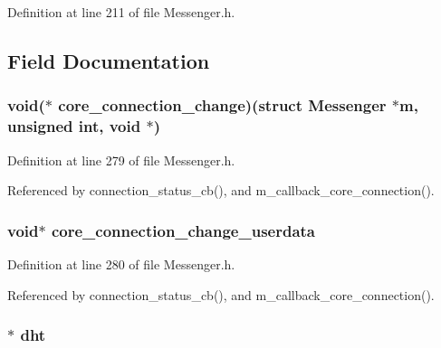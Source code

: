 Definition at line 211 of file Messenger.\+h.



\subsection{Field Documentation}
\hypertarget{struct_messenger_a04d6d710a221e33282b2305ec4158ac4}{
\subsubsection[{core\+\_\+connection\+\_\+change}]{\setlength{\rightskip}{0pt plus 5cm}void($\ast$ core\+\_\+connection\+\_\+change)(struct {\bf Messenger} $\ast${\bf m}, unsigned int, void $\ast$)}}\label{struct_messenger_a04d6d710a221e33282b2305ec4158ac4}


Definition at line 279 of file Messenger.\+h.



Referenced by connection\+\_\+status\+\_\+cb(), and m\+\_\+callback\+\_\+core\+\_\+connection().

\hypertarget{struct_messenger_a55d1d5f05bdf28588035d0bffd52ac3a}{
\subsubsection[{core\+\_\+connection\+\_\+change\+\_\+userdata}]{\setlength{\rightskip}{0pt plus 5cm}void$\ast$ core\+\_\+connection\+\_\+change\+\_\+userdata}}\label{struct_messenger_a55d1d5f05bdf28588035d0bffd52ac3a}


Definition at line 280 of file Messenger.\+h.



Referenced by connection\+\_\+status\+\_\+cb(), and m\+\_\+callback\+\_\+core\+\_\+connection().

\hypertarget{struct_messenger_a8b3d6ce8745acc52695e252bdb1531b6}{
\subsubsection[{dht}]{$\ast$ dht}}\label{struct_messenger_a8b3d6ce8745acc52695e252bdb1531b6}


